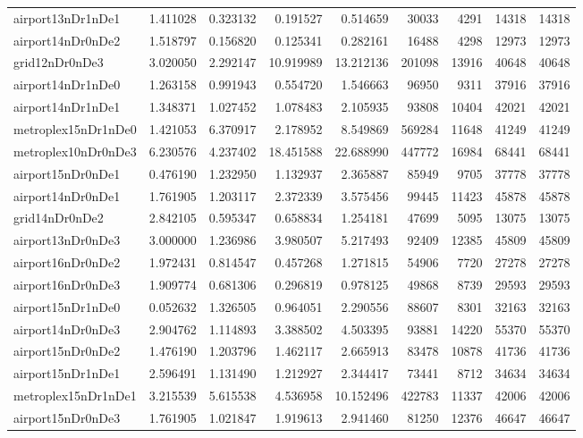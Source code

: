 \begin{longtable}{|l|r|r|r|r|r|r|r|r|}
airport13nDr1nDe1 & 1.411028 & 0.323132 & 0.191527 & 0.514659 & 30033 & 4291 & 14318 & 14318 \\
airport14nDr0nDe2 & 1.518797 & 0.156820 & 0.125341 & 0.282161 & 16488 & 4298 & 12973 & 12973 \\
grid12nDr0nDe3 & 3.020050 & 2.292147 & 10.919989 & 13.212136 & 201098 & 13916 & 40648 & 40648 \\
airport14nDr1nDe0 & 1.263158 & 0.991943 & 0.554720 & 1.546663 & 96950 & 9311 & 37916 & 37916 \\
airport14nDr1nDe1 & 1.348371 & 1.027452 & 1.078483 & 2.105935 & 93808 & 10404 & 42021 & 42021 \\
metroplex15nDr1nDe0 & 1.421053 & 6.370917 & 2.178952 & 8.549869 & 569284 & 11648 & 41249 & 41249 \\
metroplex10nDr0nDe3 & 6.230576 & 4.237402 & 18.451588 & 22.688990 & 447772 & 16984 & 68441 & 68441 \\
airport15nDr0nDe1 & 0.476190 & 1.232950 & 1.132937 & 2.365887 & 85949 & 9705 & 37778 & 37778 \\
airport14nDr0nDe1 & 1.761905 & 1.203117 & 2.372339 & 3.575456 & 99445 & 11423 & 45878 & 45878 \\
grid14nDr0nDe2 & 2.842105 & 0.595347 & 0.658834 & 1.254181 & 47699 & 5095 & 13075 & 13075 \\
airport13nDr0nDe3 & 3.000000 & 1.236986 & 3.980507 & 5.217493 & 92409 & 12385 & 45809 & 45809 \\
airport16nDr0nDe2 & 1.972431 & 0.814547 & 0.457268 & 1.271815 & 54906 & 7720 & 27278 & 27278 \\
airport16nDr0nDe3 & 1.909774 & 0.681306 & 0.296819 & 0.978125 & 49868 & 8739 & 29593 & 29593 \\
airport15nDr1nDe0 & 0.052632 & 1.326505 & 0.964051 & 2.290556 & 88607 & 8301 & 32163 & 32163 \\
airport14nDr0nDe3 & 2.904762 & 1.114893 & 3.388502 & 4.503395 & 93881 & 14220 & 55370 & 55370 \\
airport15nDr0nDe2 & 1.476190 & 1.203796 & 1.462117 & 2.665913 & 83478 & 10878 & 41736 & 41736 \\
airport15nDr1nDe1 & 2.596491 & 1.131490 & 1.212927 & 2.344417 & 73441 & 8712 & 34634 & 34634 \\
metroplex15nDr1nDe1 & 3.215539 & 5.615538 & 4.536958 & 10.152496 & 422783 & 11337 & 42006 & 42006 \\
airport15nDr0nDe3 & 1.761905 & 1.021847 & 1.919613 & 2.941460 & 81250 & 12376 & 46647 & 46647 \\

\end{longtable}
